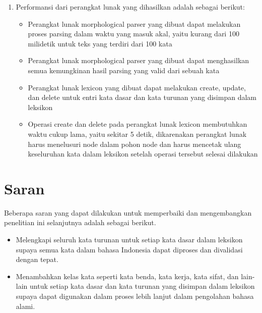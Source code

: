 \begin{enumerate}
	\item Performansi dari perangkat lunak yang dihasilkan adalah sebagai berikut:
	\begin{itemize}
		\item Perangkat lunak morphological parser yang dibuat dapat melakukan proses parsing dalam waktu yang masuk akal, yaitu kurang dari 100 milidetik untuk teks yang terdiri dari 100 kata
		\item Perangkat lunak morphological parser yang dibuat dapat menghasilkan semua kemungkinan hasil parsing yang valid dari sebuah kata
		\item Perangkat lunak lexicon yang dibuat dapat melakukan create, update, dan delete untuk entri kata dasar dan kata turunan yang disimpan dalam leksikon
		\item Operasi create dan delete pada perangkat lunak lexicon membutuhkan waktu cukup lama, yaitu sekitar 5 detik, dikarenakan perangkat lunak harus menelusuri node dalam pohon node dan harus mencetak ulang keseluruhan kata dalam leksikon setelah operasi tersebut selesai dilakukan
	\end{itemize}
	
\end{enumerate}


\section{Saran}
\label{sec:saran}

Beberapa saran yang dapat dilakukan untuk memperbaiki dan mengembangkan penelitian ini selanjutnya adalah sebagai berikut.

\begin{itemize}
	\item Melengkapi seluruh kata turunan untuk setiap kata dasar dalam leksikon supaya semua kata dalam bahasa Indonesia dapat diproses dan divalidasi dengan tepat.
	\item Menambahkan kelas kata seperti kata benda, kata kerja, kata sifat, dan lain-lain untuk setiap kata dasar dan kata turunan yang disimpan dalam leksikon supaya dapat digunakan dalam proses lebih lanjut dalam pengolahan bahasa alami.
\end{itemize}
